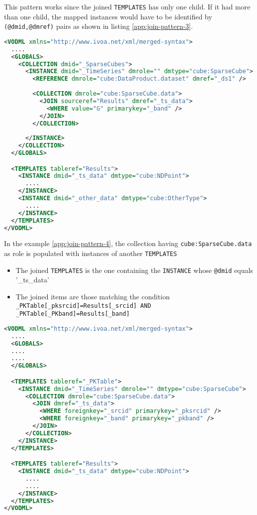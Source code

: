 This pattern works since the joined \texttt{TEMPLATES} has only one child. 
If it had more than one child, the mapped instances would have to be identified by \texttt{(@dmid,@dmref)} pairs as shown in listing \ref{app:join-pattern-3}.

\begin{lstlisting}[label={app:join-pattern-3},caption={Joining a \texttt{TEMPLATES} with a global \texttt{COLLECTION} identified by both \texttt{@sourceref} and \texttt{(@dmid,@dmref)} pairs.},language=XML]
<VODML xmlns="http://www.ivoa.net/xml/merged-syntax">
  ....
  <GLOBALS>
    <COLLECTION dmid="_SparseCubes">
      <INSTANCE dmid="_TimeSeries" dmrole="" dmtype="cube:SparseCube">
        <REFERENCE dmrole="cube:DataProduct.dataset" dmref="_ds1" />
        
        <COLLECTION dmrole="cube:SparseCube.data">
          <JOIN sourceref="Results" dmref="_ts_data">
            <WHERE value="G" primarykey="_band" />
          </JOIN>
        </COLLECTION>
        
      </INSTANCE>
    </COLLECTION>
  </GLOBALS>

  <TEMPLATES tableref="Results">
    <INSTANCE dmid="_ts_data" dmtype="cube:NDPoint">
      ....
    </INSTANCE>
    <INSTANCE dmid="_other_data" dmtype="cube:OtherType">
      ....
    </INSTANCE>
  </TEMPLATES>
</VODML>
\end{lstlisting}  

In the example \ref{app:join-pattern-4}, the collection having \texttt{cube:SparseCube.data} as role is populated with  instances of another \texttt{TEMPLATES}
\begin{itemize}
  \item The joined \texttt{TEMPLATES} is the one containing the  \texttt{INSTANCE} whose \texttt{@dmid} equals '\_ts\_data'
  \item The joined items are those matching the condition \\ \texttt{\_PKTable[\_pksrcid]=Results[\_srcid] AND  \_PKTable[\_PKband]=Results[\_band]}
\end{itemize}


\begin{lstlisting}[label={app:join-pattern-4},caption={Joining two \texttt{TEMPLATES} together with \texttt{(@dmid,@dmref)} pairs.},language=XML]
<VODML xmlns="http://www.ivoa.net/xml/merged-syntax">
  ....
  <GLOBALS>
  ....
  ....
  </GLOBALS>

  <TEMPLATES tableref="_PKTable">
    <INSTANCE dmid="_TimeSeries" dmrole="" dmtype="cube:SparseCube">
      <COLLECTION dmrole="cube:SparseCube.data">
        <JOIN dmref="_ts_data">
          <WHERE foreignkey="_srcid" primarykey="_pksrcid" />
          <WHERE foreignkey="_band" primarykey="_pkband" />
        </JOIN>
      </COLLECTION>
    </INSTANCE>
  </TEMPLATES>

  <TEMPLATES tableref="Results">
    <INSTANCE dmid="_ts_data" dmtype="cube:NDPoint">
      ....
      ....
    </INSTANCE>
  </TEMPLATES>
</VODML>
\end{lstlisting}  

